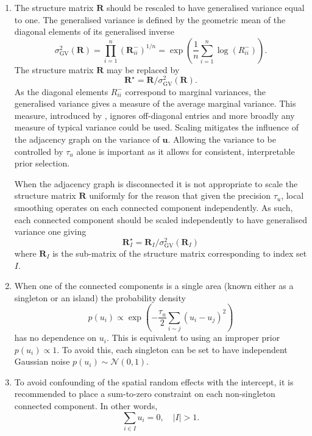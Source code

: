 \documentclass[a4paper, nobind]{templates/ociamthesis}
\begin{document}
\begin{enumerate}
\def\labelenumi{\arabic{enumi}.}
\item
  The structure matrix \(\mathbf{R}\) should be rescaled to have generalised variance equal to one.
  The generalised variance is defined by the geometric mean of the diagonal elements of its generalised inverse
  \begin{equation}
   \sigma^2_{\text{GV}}(\mathbf{R}) = \prod_{i = 1}^n (\mathbf{R}^-_{ii})^{1/n} = \exp \left( \frac{1}{n} \sum_{i = 1}^n \log (R^-_{ii}) \right).
  \end{equation}
  The structure matrix \(\mathbf{R}\) may be replaced by
  \begin{equation}
  \mathbf{R}^\star = \mathbf{R} / \sigma^2_{\text{GV}}(\mathbf{R}).
  \end{equation}
  As the diagonal elements \(R^-_{ii}\) correspond to marginal variances, the generalised variance gives a measure of the average marginal variance.
  This measure, introduced by \textcite{sorbye2014scaling}, ignores off-diagonal entries and more broadly any measure of typical variance could be used.
  Scaling mitigates the influence of the adjacency graph on the variance of \(\mathbf{u}\).
  Allowing the variance to be controlled by \(\tau_u\) alone is important as it allows for consistent, interpretable prior selection.

  When the adjacency graph is disconnected it is not appropriate to scale the structure matrix \(\mathbf{R}\) uniformly for the reason that given the precision \(\tau_u\), local smoothing operates on each connected component independently.
  As such, each connected component should be scaled independently to have generalised variance one giving
  \begin{equation}
     \mathbf{R}^\star_I = \mathbf{R}_I / \sigma^2_{\text{GV}}(\mathbf{R}_I)
   \end{equation}
  where \(\mathbf{R}_I\) is the sub-matrix of the structure matrix corresponding to index set \(I\).
\item
  When one of the connected components is a single area (known either as a singleton or an island) the probability density
  \begin{equation}
    p(u_i) \propto  \exp \left( -\frac{\tau_u}{2} \sum_{i \sim j} (u_i - u_j)^2 \right)
  \end{equation}
  has no dependence on \(u_i\).
  This is equivalent to using an improper prior \(p(u_i) \propto 1\).
  To avoid this, each singleton can be set to have independent Gaussian noise \(p(u_i) \sim \mathcal{N}(0, 1)\).
\item
  To avoid confounding of the spatial random effects with the intercept, it is recommended to place a sum-to-zero constraint on each non-singleton connected component.
  In other words,
  \begin{equation}
    \sum_{i \in I} u_i = 0, \quad |I| > 1.
  \end{equation}
\end{enumerate}
\end{document}
